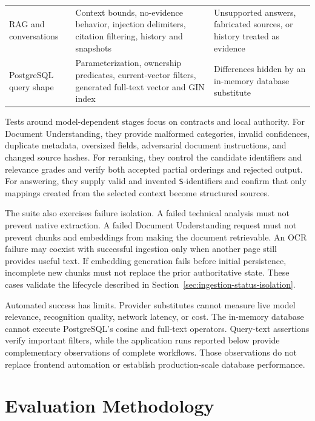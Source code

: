 \begin{table}[!htbp]
\begin{tabular}{L{0.25\textwidth} L{0.34\textwidth} L{0.31\textwidth}}
        RAG and conversations & Context bounds, no-evidence behavior, injection delimiters, citation filtering, history and snapshots & Unsupported answers, fabricated sources, or history treated as evidence \\
        PostgreSQL query shape & Parameterization, ownership predicates, current-vector filters, generated full-text vector and GIN index & Differences hidden by an in-memory database substitute \\
        \bottomrule
    \end{tabular}
\end{table}

Tests around model-dependent stages focus on contracts and local authority. For Document Understanding, they provide malformed categories, invalid confidences, duplicate metadata, oversized fields, adversarial document instructions, and changed source hashes. For reranking, they control the candidate identifiers and relevance grades and verify both accepted partial orderings and rejected output. For answering, they supply valid and invented \texttt{S}-identifiers and confirm that only mappings created from the selected context become structured sources.

The suite also exercises failure isolation. A failed technical analysis must not prevent native extraction. A failed Document Understanding request must not prevent chunks and embeddings from making the document retrievable. An OCR failure may coexist with successful ingestion only when another page still provides useful text. If embedding generation fails before initial persistence, incomplete new chunks must not replace the prior authoritative state. These cases validate the lifecycle described in Section~\ref{sec:ingestion-status-isolation}.

Automated success has limits. Provider substitutes cannot measure live model relevance, recognition quality, network latency, or cost. The in-memory database cannot execute PostgreSQL's cosine and full-text operators. Query-text assertions verify important filters, while the application runs reported below provide complementary observations of complete workflows. Those observations do not replace frontend automation or establish production-scale database performance.

\section{Evaluation Methodology}
\label{sec:evaluation-methodology}

